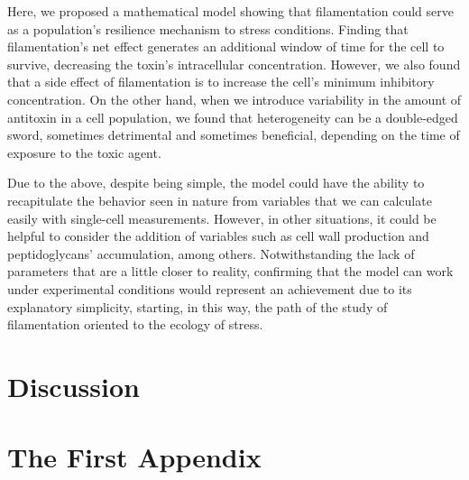 \documentclass[a4paper, nobind]{templates/ociamthesis}
\newcommand*{\bibtitle}{Works Cited}
\begin{document}
Here, we proposed a mathematical model showing that filamentation could serve as a population's resilience mechanism to stress conditions. Finding that filamentation's net effect generates an additional window of time for the cell to survive, decreasing the toxin's intracellular concentration. However, we also found that a side effect of filamentation is to increase the cell's minimum inhibitory concentration. On the other hand, when we introduce variability in the amount of antitoxin in a cell population, we found that heterogeneity can be a double-edged sword, sometimes detrimental and sometimes beneficial, depending on the time of exposure to the toxic agent.

Due to the above, despite being simple, the model could have the ability to recapitulate the behavior seen in nature from variables that we can calculate easily with single-cell measurements. However, in other situations, it could be helpful to consider the addition of variables such as cell wall production and peptidoglycans' accumulation, among others. Notwithstanding the lack of parameters that are a little closer to reality, confirming that the model can work under experimental conditions would represent an achievement due to its explanatory simplicity, starting, in this way, the path of the study of filamentation oriented to the ecology of stress.

\hypertarget{chapter-discussion}{%
\chapter{Discussion}\label{chapter-discussion}}

\minitoc 

\noindent

\startappendices

\hypertarget{the-first-appendix}{%
\chapter{The First Appendix}\label{the-first-appendix}}


\setlength{\baselineskip}{0pt} %

{\renewcommand*\MakeUppercase[1]{#1}%
\printbibliography[heading=bibintoc,title={\bibtitle}]}
\end{document}
